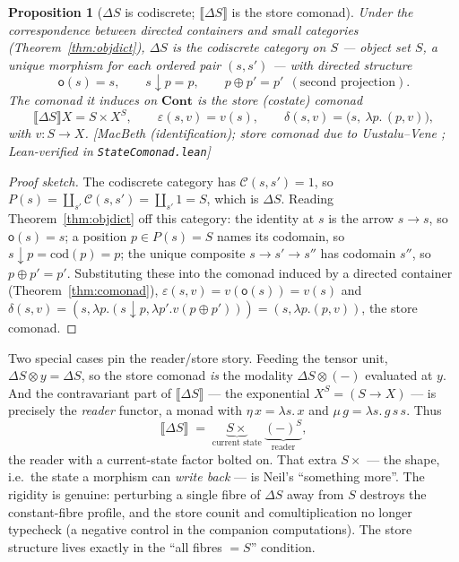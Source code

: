 \documentclass[11pt,a4paper]{book}
\newcommand{\Cont}{\mathbf{Cont}}
\newcommand{\y}{y}
\newcommand{\Ext}[1]{\llbracket #1 \rrbracket}
\newcommand{\cod}{\mathrm{cod}}
\theoremstyle{plain}
\newtheorem{Proposition}[Theorem]{Proposition}
\theoremstyle{definition}
\theoremstyle{remark}
\newcommand{\prov}[1]{\hfill\textsf{\footnotesize[#1]}}
\begin{document}
\begin{Proposition}[$\Delta S$ is codiscrete; $\Ext{\Delta S}$ is the store comonad]
\label{prop:store}
Under the correspondence between directed containers and small categories
(Theorem~\ref{thm:objdict}), $\Delta S$ is the \emph{codiscrete} category on $S$ --- object set $S$,
a unique morphism for each ordered pair $(s,s')$ --- with directed structure
\[
  \mathsf o(s)=s,\qquad s\downarrow p=p,\qquad p\oplus p'=p'\ \ (\text{second projection}).
\]
The comonad it induces on $\Cont$ is the \emph{store} (costate) comonad
\[
  \Ext{\Delta S}X=S\times X^{S},\qquad
  \varepsilon(s,v)=v(s),\qquad
  \delta(s,v)=\bigl(s,\ \lambda p.\,(p,v)\bigr),
\]
with $v\colon S\to X$.
\prov{MacBeth (identification); store comonad due to Uustalu--Vene \cite{UustaluVene08};
Lean-verified in \texttt{StateComonad.lean}\protect\footnotemark}
\end{Proposition}

\begin{proof}[Proof sketch]
The codiscrete category has $\mathcal C(s,s')=1$, so
$P(s)=\coprod_{s'}\mathcal C(s,s')=\coprod_{s'}1=S$, which is $\Delta S$. Reading Theorem~\ref{thm:objdict}
off this category: the identity at $s$ is the arrow $s\to s$, so $\mathsf o(s)=s$; a position $p\in P(s)=S$
names its codomain, so $s\downarrow p=\cod(p)=p$; the unique composite $s\to s'\to s''$ has codomain
$s''$, so $p\oplus p'=p'$. Substituting these into the comonad induced by a directed container
(Theorem~\ref{thm:comonad}), $\varepsilon(s,v)=v(\mathsf o(s))=v(s)$ and
$\delta(s,v)=(s,\lambda p.(s\downarrow p,\lambda p'.v(p\oplus p')))=(s,\lambda p.(p,v))$, the store comonad.
\end{proof}

Two special cases pin the reader/store story. Feeding the tensor unit, $\Delta S\otimes\y=\Delta S$, so
the store comonad \emph{is} the modality $\Delta S\otimes(-)$ evaluated at $\y$. And the contravariant part
of $\Ext{\Delta S}$ --- the exponential $X^{S}=(S\to X)$ --- is precisely the \emph{reader} functor, a monad
with $\eta\,x=\lambda s.\,x$ and $\mu\,g=\lambda s.\,g\,s\,s$. Thus
\[
  \Ext{\Delta S}\;=\;\underbrace{S\times{}}_{\text{current state}}\ \underbrace{(-)^{S}}_{\text{reader}},
\]
the reader with a current-state factor bolted on. That extra $S\times$ --- the shape, i.e.\ the state a
morphism can \emph{write back} --- is Neil's ``something more''. The rigidity is genuine: perturbing a single
fibre of $\Delta S$ away from $S$ destroys the constant-fibre profile, and the store counit and
comultiplication no longer typecheck (a negative control in the companion computations). The store structure
lives exactly in the ``all fibres $=S$'' condition.
\end{document}
